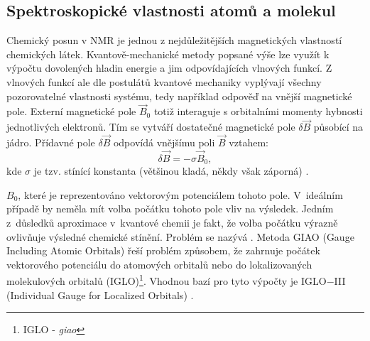 \documentclass[
digital, %
table,   %
lof,     %
lot,     %
oneside,
]{fithesis3}
\begin{document}
\subsection{Spektroskopické vlastnosti atomů a molekul}
Chemický posun v NMR je jednou z nejdůležitějších magnetických vlastností chemických látek. Kvantově-mechanické metody popsané výše lze využít k výpočtu dovolených hladin energie a jim odpovídajících vlnových funkcí. Z vlnových funkcí ale dle postulátů kvantové mechaniky vyplývají všechny pozorovatelné vlastnosti systému, tedy například odpověď na vnější magnetické pole. Externí magnetické pole $\vec{B}_0$ totiž interaguje s orbitalními momenty hybnosti jednotlivých elektronů. Tím se vytváří dostatečné magnetické pole $\delta \vec{B}$ působící na jádro. Přídavné pole $\delta \vec{B}$ odpovídá vnějšímu poli $\vec{B}$ vztahem:
\begin{equation}
\delta \vec{B} = - \sigma \vec{B}_0,
\end{equation}
kde $\sigma$ je tzv. stínící konstanta (většinou kladá, někdy však záporná) \cite{atkins2010atkins}.

$B_0$, které je reprezentováno vektorovým potenciálem tohoto pole. V~ideálním případě by neměla mít volba počátku tohoto pole vliv na výsledek. Jedním z~důsledků aproximace v~kvantové chemii je fakt, že volba počátku výrazně ovlivňuje výsledné chemické stínění. Problém se nazývá . Metoda GIAO \cite{giao} (Gauge  Including Atomic Orbitals) řeší problém způsobem, že zahrnuje počátek vektorového potenciálu do atomových orbitalů nebo do lokalizovaných molekulových orbitalů (IGLO)\footnote{IGLO - \textit{giao}}. Vhodnou bazí pro tyto výpočty je IGLO$-$III \cite{Standara2006thesis} (Individual Gauge for Localized Orbitals) \cite{g09}.
\end{document}
